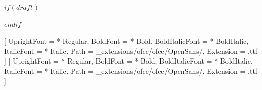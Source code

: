 \usepackage{titlepic}
\usepackage{titling}
\usepackage{graphicx}
\usepackage{fontspec}
\usepackage{placeins}
\usepackage{graphbox}
\usepackage{tikz}
\usepackage{geometry}
\usepackage{xcolor}
\usepackage{amsmath}
\usepackage[some]{background}
$if(draft)$
\usepackage[stamp,color=red!10]{draftwatermark}
$endif$
\usepackage{lipsum}
\usepackage{caption}
\usepackage{datetime}
\usepackage{xstring}
\usepackage{blindtext}
\usepackage{scrlayer-scrpage}

\setmainfont{OpenSans}[
  UprightFont = {*-Regular},
  BoldFont = {*-Bold},
  BoldItalicFont = {*-BoldItalic},
  ItalicFont = {*-Italic},
  Path = {_extensions/ofce/ofce/OpenSans/},
  Extension = {.ttf}
]
\setsansfont{OpenSans}[
  UprightFont = {*-Regular},
  BoldFont = {*-Bold},
  BoldItalicFont = {*-BoldItalic},
  ItalicFont = {*-Italic},
  Path = {_extensions/ofce/ofce/OpenSans/},
  Extension = {.ttf}
]

\def\getYear#1{\StrLeft{#1}{4}}
\def\getMonth#1{\StrMid{#1}{6}{7}}
\def\getDay#1{\StrRight{#1}{2}}

\def\jolimois#1{\monthname{\getMonth{#1}}}


\clearpairofpagestyles


\pagestyle{scrheadings}

\lofoot*{\thepage}
